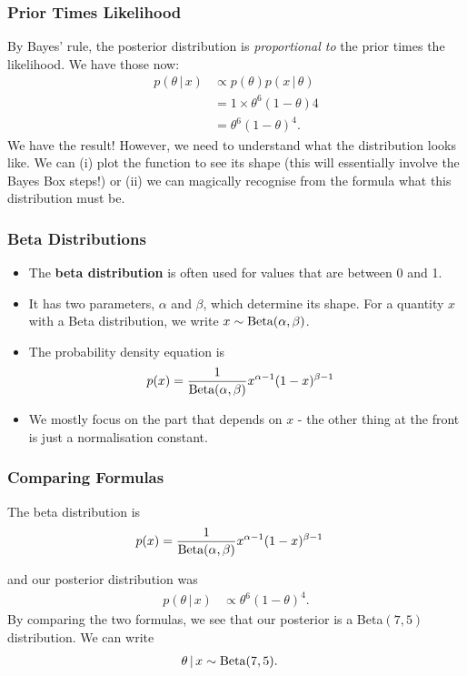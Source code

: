 \documentclass{beamer}
\newcommand{\given}{\,|\,}
\begin{document}
\begin{frame}
\frametitle{Prior Times Likelihood}
By Bayes' rule, the posterior distribution is {\em proportional to}
the prior times the likelihood. We have those now:
\begin{align}
p(\theta \given x) &\propto p(\theta) p(x \given \theta) \\
                   &= 1 \times \theta^6(1-\theta)4 \\
                   &= \theta^6(1-\theta)^4.
\end{align}
\pause
We have the result! However, we need to understand what the distribution
looks like. We can (i) plot the function to see its shape (this will essentially
involve the Bayes Box steps!) or (ii) we can magically recognise from the
formula what this distribution must be.

\end{frame}


\begin{frame}
\frametitle{Beta Distributions}

\begin{itemize}
\item The {\bf beta distribution} is often used for values that are between 0
and 1.\pause
\item It has two parameters, $\alpha$ and $\beta$, which determine its shape.
For a quantity $x$ with a Beta distribution, we write $x \sim \textnormal{Beta}(\alpha, \beta)$.\pause
\item The probability density equation is
\begin{align}
p(x) &= \frac{1}{\textnormal{Beta}(\alpha, \beta)}
            x^{\alpha - 1}(1-x)^{\beta - 1}
\end{align} \pause
\item We mostly focus on the part that depends on $x$ - the other thing
at the front is just a normalisation constant.
\end{itemize}

\end{frame}

\begin{frame}
\frametitle{Comparing Formulas}

The beta distribution is
\begin{align}
p(x) &= \frac{1}{\textnormal{Beta}(\alpha, \beta)}
            x^{\alpha - 1}(1-x)^{\beta - 1}
\end{align}

and our posterior distribution was
\begin{align}
p(\theta \given x) &\propto \theta^6(1-\theta)^4.
\end{align}\pause
By comparing the two formulas, we see that our posterior is
a Beta$(7, 5)$ distribution. We can write
\begin{align}
\theta \given x &\sim \textnormal{Beta}(7, 5).
\end{align}

\end{frame}
\end{document}
